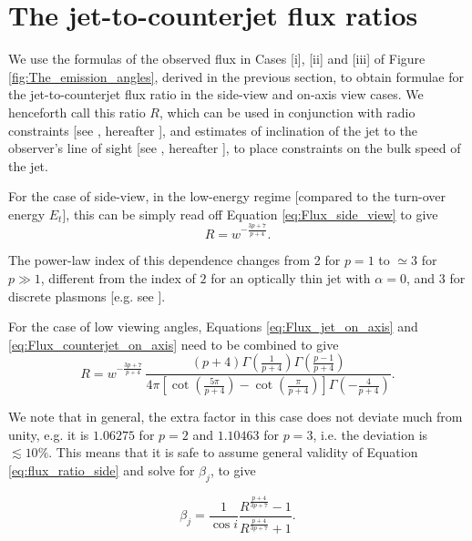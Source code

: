 \section{The jet-to-counterjet flux ratios}
\label{sec:jet-to-counterjet_ratio}
We use the formulas of the observed flux in Cases [i], [ii] and [iii] of Figure \ref{fig:The_emission_angles}, derived in the previous section, to obtain formulae for the jet-to-counterjet flux ratio in the side-view and on-axis view cases. We henceforth call this ratio $R$, which can be used in conjunction with radio constraints [see \cite{Stirling_et_al.-2001-MNRAS}, hereafter ], and estimates of inclination of the jet to the observer's line of sight [see \cite{Orosz_et_al.-2011-ApJ}, hereafter ], to place constraints on the bulk speed of the jet.

For the case of side-view, in the low-energy regime [compared to the turn-over energy $E_t$], this can be simply read off Equation \ref{eq:Flux_side_view} to give
\begin{equation}
R = w^{-\frac{3p+7}{p+4}}.
\label{eq:flux_ratio_side}
\end{equation}

The power-law index of this dependence changes from 2 for $ p = 1 $ to $ \simeq 3 $ for $ p \gg 1 $, different from the index of $2$ for an optically thin jet with $ \alpha = 0 $, and $3$ for discrete plasmons [e.g. see ].

For the case of low viewing angles, Equations \ref{eq:Flux_jet_on_axis} and \ref{eq:Flux_counterjet_on_axis} need to be combined to give
\begin{equation}
R = w^{-\frac{3p+7}{p+4}} \, \frac{(p+4) \Gamma \left(\frac{1}{p+4}\right) \Gamma \left(\frac{p-1}{p+4}\right)}{4 \pi  \left[\cot \left(\frac{5 \pi }{p+4}\right)-\cot \left(\frac{\pi }{p+4}\right)\right] \Gamma \left(-\frac{4}{p+4}\right)} .
\label{eq:flux_ratio_on-axis}
\end{equation}

We note that in general, the extra factor in this case does not deviate much from unity, e.g. it is $1.06275$ for $ p = 2 $ and $ 1.10463 $ for $ p = 3 $, i.e. the deviation is $ \lesssim 10 \% $. This means that it is safe to assume general validity of Equation \ref{eq:flux_ratio_side} and solve for $ \beta_j $, to give

\begin{equation}
\beta_j = \frac{1}{\cos i} \dfrac{ R^\frac{p+4}{3p+7} - 1 }{ R^\frac{p+4}{3p+7} + 1 }.
\label{eq:beta}
\end{equation}


